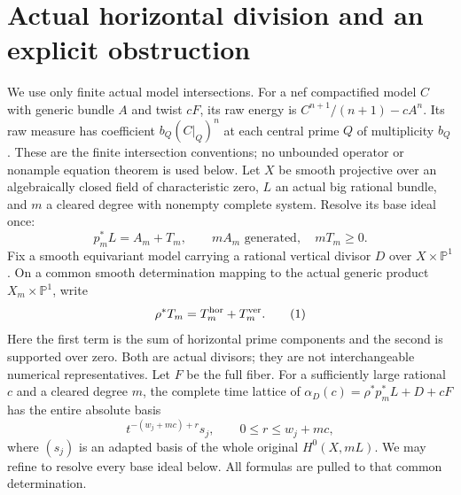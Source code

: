 \documentclass[10pt]{article}
\begin{document}
\section{Actual horizontal division and an explicit obstruction}
We use only finite actual model intersections. For a nef compactified
model $C$ with generic bundle $A$ and twist $cF$, its raw energy is
$C^{n+1}/(n+1)-cA^n$. Its raw measure has coefficient
$b_Q(C|_Q)^n$ at each central prime $Q$ of multiplicity $b_Q$.
These are the finite intersection conventions; no unbounded operator
or nonample equation theorem is used below.
Let $X$ be smooth projective over an algebraically closed field of
characteristic zero, $L$ an actual big rational bundle, and $m$ a cleared
degree with nonempty complete system. Resolve its base ideal once:
\[
 p_m^*L=A_m+T_m,\qquad mA_m\text{ generated},\quad mT_m\geq0.
\]
Fix a smooth equivariant model carrying a rational vertical divisor $D$
over $X\times\mathbb P^1$. On a common smooth determination mapping
to the actual generic product $X_m\times\mathbb P^1$, write
\[
 \rho^*T_m=T_m^{\rm hor}+T_m^{\rm ver}.
                                                        \tag{1}
\]
Here the first term is the sum of horizontal prime components and the
second is supported over zero. Both are actual divisors; they are not
interchangeable numerical representatives. Let $F$ be the full fiber.
For a sufficiently large rational $c$ and a cleared degree $m$, the
complete time lattice of $\alpha_D(c)=\rho^*p_m^*L+D+cF$ has the
entire absolute basis
\[
 t^{-(w_j+mc)+r}s_j,\qquad 0\leq r\leq w_j+mc,
                                                        \tag{2}
\]
where $(s_j)$ is an adapted basis of the whole original $H^0(X,mL)$.
We may refine to resolve every base ideal below. All formulas are pulled
to that common determination.
\end{document}
